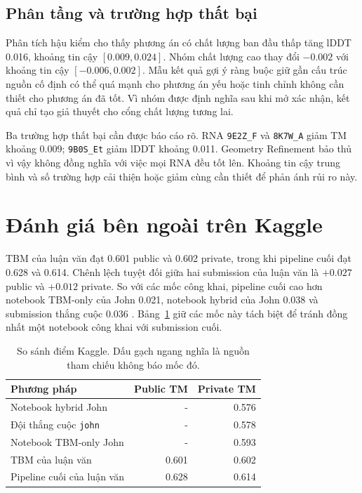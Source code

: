 \documentclass[12pt,a4paper,oneside]{report}
\begin{document}
\subsection{Phân tầng và trường hợp thất bại}

Phân tích hậu kiểm cho thấy phương án có chất lượng ban đầu thấp tăng lDDT 0.016,
khoảng tin cậy $[0.009,0.024]$. Nhóm chất lượng cao thay đổi $-0.002$ với
khoảng tin cậy $[-0.006,0.002]$. Mẫu kết quả gợi ý ràng buộc giữ gần cấu trúc nguồn cố định có thể quá
mạnh cho phương án yếu hoặc tinh chỉnh không cần thiết cho phương án đã tốt. Vì nhóm
được định nghĩa sau khi mở xác nhận, kết quả chỉ tạo giả thuyết cho cổng chất lượng tương
lai.

Ba trường hợp thất bại cần được báo cáo rõ. RNA \texttt{9E2Z\_F} và
\texttt{8K7W\_A} giảm TM khoảng 0.009; \texttt{9B0S\_Et} giảm lDDT khoảng 0.011.
Geometry Refinement bảo thủ vì vậy không đồng nghĩa với việc mọi RNA đều tốt lên. Khoảng tin cậy
trung bình và số trường hợp cải thiện hoặc giảm cùng cần thiết để phản ánh rủi ro này.

\section{Đánh giá bên ngoài trên Kaggle}

TBM của luận văn đạt 0.601 public và 0.602 private, trong khi pipeline cuối đạt 0.628 và
0.614. Chênh lệch tuyệt đối giữa hai submission của luận văn là $+0.027$ public và
$+0.012$ private. So với các mốc công khai, pipeline cuối cao hơn notebook TBM-only của
John 0.021, notebook hybrid của John 0.038 và submission thắng cuộc 0.036
\cite{kaggle_top1,kaggle_hybrid}. Bảng~\ref{tab:kaggle_compare_vi} giữ các mốc này tách
biệt để tránh đồng nhất một notebook công khai với submission cuối.

\begin{table}[H]
\centering
\caption{So sánh điểm Kaggle. Dấu gạch ngang nghĩa là nguồn tham chiếu không báo mốc đó.}
\label{tab:kaggle_compare_vi}
\begin{tabular}{lrr}
\toprule
Phương pháp & Public TM & Private TM \\
\midrule
Notebook hybrid John & - & 0.576 \\
Đội thắng cuộc \texttt{john} & - & 0.578 \\
Notebook TBM-only John & - & 0.593 \\
TBM của luận văn & 0.601 & 0.602 \\
Pipeline cuối của luận văn & 0.628 & 0.614 \\
\bottomrule
\end{tabular}
\end{table}
\end{document}
